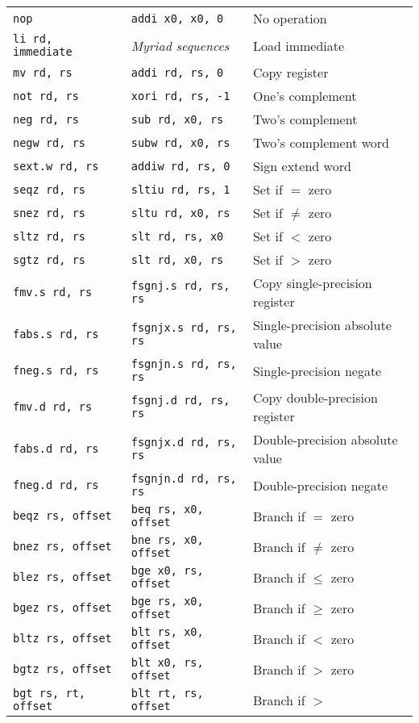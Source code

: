 \begin{table}[h]
\begin{small}
\begin{center}
\begin{tabular}{l l l}
\hline
{\tt nop} & {\tt addi x0, x0, 0} & No operation \\
{\tt li rd, immediate} & {\em Myriad sequences} & Load immediate \\
{\tt mv rd, rs} & {\tt addi rd, rs, 0} & Copy register \\
{\tt not rd, rs} & {\tt xori rd, rs, -1} & One's complement \\
{\tt neg rd, rs} & {\tt sub rd, x0, rs} & Two's complement \\
{\tt negw rd, rs} & {\tt subw rd, x0, rs} & Two's complement word \\
{\tt sext.w rd, rs} & {\tt addiw rd, rs, 0} & Sign extend word \\
{\tt seqz rd, rs} & {\tt sltiu rd, rs, 1} & Set if $=$ zero \\
{\tt snez rd, rs} & {\tt sltu rd, x0, rs} & Set if $\neq$ zero \\
{\tt sltz rd, rs} & {\tt slt rd, rs, x0} & Set if $<$ zero \\
{\tt sgtz rd, rs} & {\tt slt rd, x0, rs} & Set if $>$ zero \\
\hline
{\tt fmv.s rd, rs} & {\tt fsgnj.s rd, rs, rs} & Copy single-precision register \\
{\tt fabs.s rd, rs} & {\tt fsgnjx.s rd, rs, rs} & Single-precision absolute value \\
{\tt fneg.s rd, rs} & {\tt fsgnjn.s rd, rs, rs} & Single-precision negate \\
{\tt fmv.d rd, rs} & {\tt fsgnj.d rd, rs, rs} & Copy double-precision register \\
{\tt fabs.d rd, rs} & {\tt fsgnjx.d rd, rs, rs} & Double-precision absolute value \\
{\tt fneg.d rd, rs} & {\tt fsgnjn.d rd, rs, rs} & Double-precision negate \\
\hline
{\tt beqz rs, offset} & {\tt beq rs, x0, offset} & Branch if $=$ zero \\
{\tt bnez rs, offset} & {\tt bne rs, x0, offset} & Branch if $\neq$ zero \\
{\tt blez rs, offset} & {\tt bge x0, rs, offset} & Branch if $\leq$ zero \\
{\tt bgez rs, offset} & {\tt bge rs, x0, offset} & Branch if $\geq$ zero \\
{\tt bltz rs, offset} & {\tt blt rs, x0, offset} & Branch if $<$ zero \\
{\tt bgtz rs, offset} & {\tt blt x0, rs, offset} & Branch if $>$ zero \\
\hline
{\tt bgt rs, rt, offset} & {\tt blt rt, rs, offset} & Branch if $>$ \\

\end{tabular}
\end{center}
\end{small}
\end{table}
